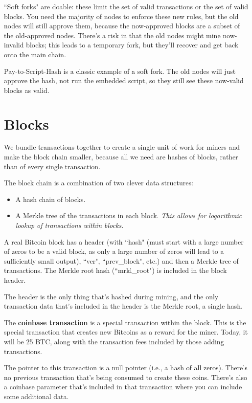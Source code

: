 \documentclass[12pt]{article}
\begin{document}
``Soft forks" are doable: these limit the set of valid transactions or the set of valid blocks. You need the majority of nodes to enforce these new rules, but the old nodes will still approve them, because the now-approved blocks are a subset of the old-approved nodes. There's a risk in that the old nodes might mine now-invalid blocks; this leads to a temporary fork, but they'll recover and get back onto the main chain.

Pay-to-Script-Hash is a classic example of a soft fork. The old nodes will just approve the hash, not run the embedded script, so they still see these now-valid blocks as valid.

\section*{Blocks}

We bundle transactions together to create a single unit of work for miners and make the block chain smaller, because all we need are hashes of blocks, rather than of every single transaction.

The block chain is a combination of two clever data structures:
\begin{itemize}
\item A hash chain of blocks.
\item A Merkle tree of the transactions in each block. \textit{This allows for logarithmic lookup of transactions within blocks.}
\end{itemize}

A real Bitcoin block has a header (with ``hash" (must start with a large number of zeros to be a valid block, as only a large number of zeros will lead to a sufficiently small output), ``ver", ``prev\_block", etc.) and then a Merkle tree of transactions. The Merkle root hash (``mrkl\_root") is included in the block header.

The header is the only thing that's hashed during mining, and the only transaction data that's included in the header is the Merkle root, a single hash.

The \textbf{coinbase transaction} is a special transaction within the block. This is the special transaction that creates new Bitcoins as a reward for the miner. Today, it will be 25 BTC, along with the transaction fees included by those adding transactions.

The pointer to this transaction is a null pointer (i.e., a hash of all zeros). There's no previous transaction that's being consumed to create these coins. There's also a coinbase parameter that's included in that transaction where you can include some additional data.
\end{document}
